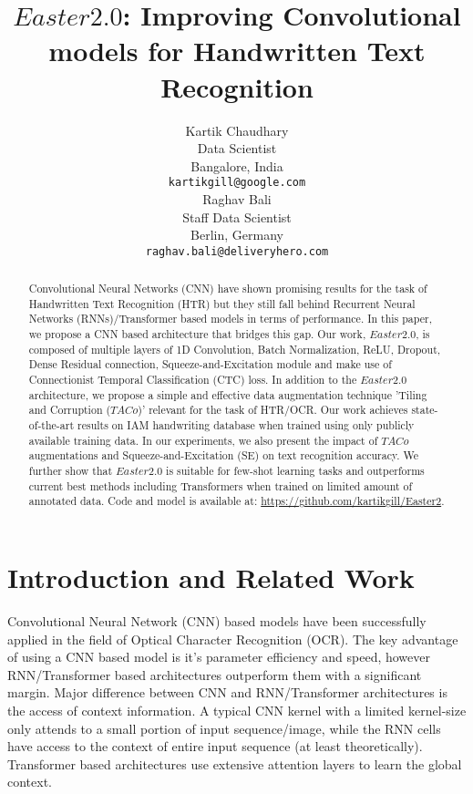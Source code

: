 \documentclass{article}
\title{$Easter2.0$: Improving Convolutional models for Handwritten Text Recognition
}
\author{
  Kartik Chaudhary\\
  Data Scientist \\
  Bangalore, India\\
  \texttt{kartikgill@google.com} \\
\And
  Raghav Bali \\
  Staff Data Scientist \\
  Berlin, Germany\\
  \texttt{raghav.bali@deliveryhero.com} \\
}
\begin{document}
\maketitle


\begin{abstract}
Convolutional Neural Networks (CNN) have shown promising results for the task of Handwritten Text Recognition (HTR) but they still fall behind Recurrent Neural Networks (RNNs)/Transformer based models in terms of performance. In this paper, we propose a CNN based architecture that bridges this gap. Our work, $Easter2.0$, is composed of multiple layers of 1D Convolution, Batch Normalization, ReLU, Dropout, Dense Residual connection, Squeeze-and-Excitation module and make use of Connectionist Temporal Classification (CTC) loss. In addition to the $Easter2.0$ architecture, we propose a simple and effective data augmentation technique 'Tiling and Corruption ($TACo$)' relevant for the task of HTR/OCR. Our work achieves state-of-the-art results on IAM handwriting database when trained using only publicly available training data. In our experiments, we also present the impact of $TACo$ augmentations and Squeeze-and-Excitation (SE) on text recognition accuracy. We further show that $Easter2.0$ is suitable for few-shot learning tasks and outperforms current best methods including Transformers when trained on limited amount of annotated data. Code and model is available at: \url{https://github.com/kartikgill/Easter2}.
\end{abstract}



\section{Introduction and Related Work}
Convolutional Neural Network (CNN) based models have been successfully applied in the field of Optical Character Recognition (OCR)\cite{Chaudhary2021EASTER,ingle2019scalable,bluche2017gated,ptucha2019intelligent,yousef2020accurate,chollet2017xception}. The key advantage of using a CNN based model is it's parameter efficiency and speed, however RNN/Transformer based architectures outperform them with a significant margin\cite{kang2020pay,diaz2021rethinking,li2021trocr,michael2019evaluating,pham2014dropout,voigtlaender2016handwriting}. Major difference between CNN and RNN/Transformer architectures is the access of context information. A typical CNN kernel with a limited kernel-size only attends to a small portion of input sequence/image, while the RNN cells have access to the context of entire input sequence (at least theoretically). Transformer based architectures use extensive attention layers to learn the global context. 
\end{document}

